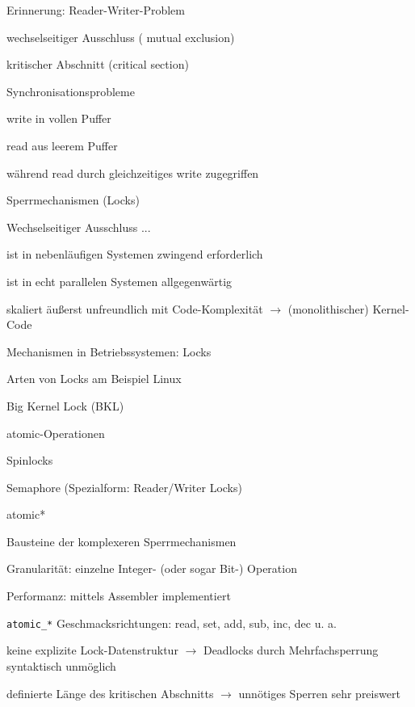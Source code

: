 \documentclass[a4paper]{article}
\begin{document}
\begin{multicols}{3}
    Erinnerung: Reader-Writer-Problem
    \begin{itemize*}
        \item wechselseitiger Ausschluss ( mutual exclusion)
        \item kritischer Abschnitt (critical section)
        \item Synchronisationsprobleme
        \begin{itemize*}
            \item write in vollen Puffer
            \item read aus leerem Puffer
            \item während read durch gleichzeitiges write zugegriffen
        \end{itemize*}
    \end{itemize*}

    Sperrmechanismen (Locks)
    \begin{itemize*}
        \item Wechselseitiger Ausschluss ...
        \begin{itemize*}
            \item ist in nebenläufigen Systemen zwingend erforderlich
            \item ist in echt parallelen Systemen allgegenwärtig
            \item skaliert äußerst unfreundlich mit Code-Komplexität $\rightarrow$ (monolithischer) Kernel-Code
        \end{itemize*}
        \item Mechanismen in Betriebssystemen: Locks
        \item Arten von Locks am Beispiel Linux
        \begin{itemize*}
            \item Big Kernel Lock (BKL)
            \item atomic-Operationen
            \item Spinlocks
            \item Semaphore (Spezialform: Reader/Writer Locks)
        \end{itemize*}
    \end{itemize*}

    atomic*
    \begin{itemize*}
        \item Bausteine der komplexeren Sperrmechanismen
        \item Granularität: einzelne Integer- (oder sogar Bit-) Operation
        \item Performanz: mittels Assembler implementiert %
        \item \texttt{atomic\_*} Geschmacksrichtungen: read, set, add, sub, inc, dec u. a.
        \item keine explizite Lock-Datenstruktur $\rightarrow$ Deadlocks durch Mehrfachsperrung syntaktisch unmöglich
        \item definierte Länge des kritischen Abschnitts $\rightarrow$ unnötiges Sperren sehr preiswert
    \end{itemize*}

\end{multicols}
\end{document}

